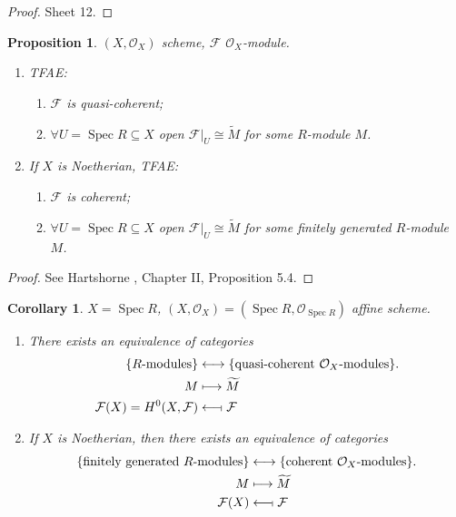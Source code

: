 \documentclass[12pt]{article}
\DeclareMathOperator{\Spec}{Spec}
\newtheorem*{proposition}{Proposition}
\newtheorem*{corollary}{Corollary}
\theoremstyle{definition}
\theoremstyle{remark}
\begin{document}
\begin{proof}
Sheet 12.
\end{proof}


\begin{proposition}
$(X,\mathcal{O}_X)$ scheme, $\mathcal{F}$ $\mathcal{O}_X$-module.

\begin{enumerate}[label=\roman*)]
\item TFAE:
\begin{enumerate}[label=\arabic*)]
\item $\mathcal{F}$ is quasi-coherent;
\item $\forall U=\Spec R\subseteq X$ open $\mathcal{F}|_U\cong\widetilde{M}$ for some $R$-module $M$.
\end{enumerate}

\item If $X$ is Noetherian, TFAE:
\begin{enumerate}[label=\arabic*)]
\item $\mathcal{F}$ is coherent;
\item $\forall U=\Spec R\subseteq X$ open $\mathcal{F}|_U\cong\widetilde{M}$ for some finitely generated $R$-module $M$.
\end{enumerate}
\end{enumerate}
\end{proposition}

\begin{proof}
See Hartshorne \cite{hartshorne2013algebraic}, Chapter II, Proposition 5.4.
\end{proof}

\begin{corollary}
$X=\Spec R$, $(X,\mathcal{O}_X)=(\Spec R,\mathcal{O}_{\Spec R})$ affine scheme.

\begin{enumerate}[label=\arabic*)]
\item There exists an equivalence of categories
\begin{align*}
\{R\text{-modules}\}&\longleftrightarrow\{\text{quasi-coherent }\mathcal{O}_X\text{-modules}\}.\\
M&\longmapsto\widetilde{M}\\
\mathcal{F}(X)=H^0(X,\mathcal{F})&\longleftarrow\!\shortmid\mathcal{F}
\end{align*}

\item If $X$ is Noetherian, then there exists an equivalence of categories
\begin{align*}
\{\text{finitely generated }R\text{-modules}\}&\longleftrightarrow\{\text{coherent }\mathcal{O}_X\text{-modules}\}.\\
M&\longmapsto\widetilde{M}\\
\mathcal{F}(X)&\longleftarrow\!\shortmid\mathcal{F}
\end{align*}
\end{enumerate}
\end{corollary}
\end{document}
